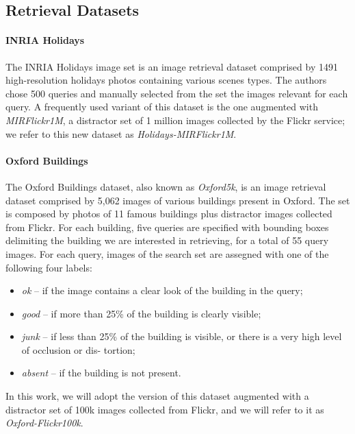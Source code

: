 \subsection{Retrieval Datasets}

\paragraph{INRIA Holidays~\cite{jegou2008hamming}}

The INRIA Holidays image set is an image retrieval dataset comprised by 1491 high-resolution holidays photos containing various scenes types.
The authors chose 500 queries and manually selected from the set the images relevant for each query.
A frequently used variant of this dataset is the one augmented with \emph{MIRFlickr1M}, a distractor set of 1 million images collected by the Flickr service;
we refer to this new dataset as \emph{Holidays-MIRFlickr1M}.

\paragraph{Oxford Buildings~\cite{philbin2007object}}
The Oxford Buildings dataset, also known as \emph{Oxford5k}, is an image retrieval dataset comprised by 5,062 images of various buildings present in Oxford.
The set is composed by photos of 11 famous buildings plus distractor images collected from Flickr.
For each building, five queries are specified with bounding boxes delimiting the building we are interested in retrieving, for a total of 55 query images.
For each query, images of the search set are assegned with one of the following four labels:
\begin{itemize}
    \item \emph{ok} -- if the image contains a clear look of the building in the query;
    \item \emph{good} -- if more than 25\% of the building is clearly visible;
    \item \emph{junk} -- if less than 25\% of the building
is visible, or there is a very high level of occlusion or dis-
tortion;
    \item \emph{absent} -- if the building is not present.
\end{itemize}
In this work, we will adopt the version of this dataset augmented with a distractor set of 100k images collected from Flickr, and we will refer to it as \emph{Oxford-Flickr100k}.


